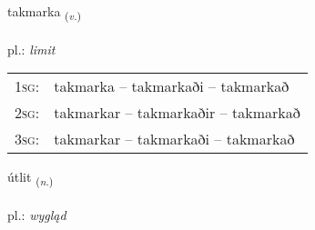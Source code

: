 \documentclass[frontgrid, backgrid]{flacards}\usepackage[]{graphicx}\usepackage[]{xcolor}
\begin{document}
\renewcommand{\flhead}{\vskip5pt \fboxsep=0pt {\small\bfseries\footnotesize Sagnorð | Verb}}
\renewcommand{\fcfoot}{\vskip5pt \fboxsep=0pt \hspace{2pt}{\small\bfseries\footnotesize 2K}}

\renewcommand{\blhead}{\vskip5pt {\small\bfseries\footnotesize Sagnorð | Verb }}
\renewcommand{\bcfoot}{\vskip5pt \hspace{2pt}{\small\bfseries\footnotesize 2K}}


{takmarka \small{\textsubscript{(\textit{v.})}} \\[1ex] %
\textphonetic{[tʰakmar̥ka]} \\
pl.: \emph{limit} \\  [2ex]
\renewcommand*{\arraystretch}{0.8}
\begin{tabular}{p{1cm}l}
\textsc{1sg}: & takmarka -- takmarkaði -- takmarkað \\ 
\textsc{2sg}: & takmarkar -- takmarkaðir -- takmarkað \\ 
\textsc{3sg}: & takmarkar -- takmarkaði -- takmarkað \\ 
\end{tabular}
}

\renewcommand{\flhead}{\vskip5pt \fboxsep=0pt {\small\bfseries\footnotesize Nafnorð | Noun}}
\renewcommand{\fcfoot}{\vskip5pt \fboxsep=0pt \hspace{2pt}{\small\bfseries\footnotesize 2K}}

\renewcommand{\blhead}{\vskip5pt {\small\bfseries\footnotesize Nafnorð | Noun }}
\renewcommand{\bcfoot}{\vskip5pt \hspace{2pt}{\small\bfseries\footnotesize 2K}}


{útlit \small{\textsubscript{(\textit{n.})}} \\[1ex] %
\textphonetic{[uːtlɪt]} \\
pl.: \emph{wygląd} \\  [2ex]
\renewcommand*{\arraystretch}{0.8}
}
\end{document}
